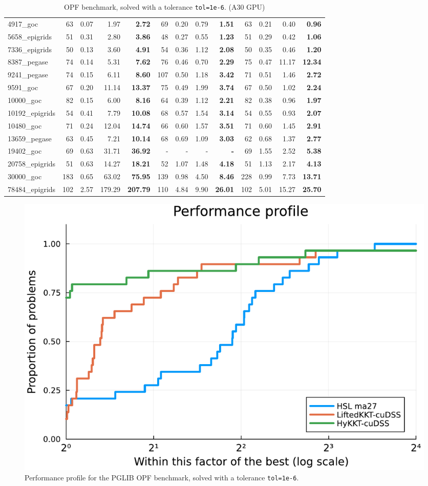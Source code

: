 \begin{table}[!ht]
{\begin{tabular}{|l|rrr >{\bfseries}r|rrr >{\bfseries}r|rrr >{\bfseries}r|}
              \hline
        4917\_goc & 63 & 0.07 & 1.97 & 2.72 & 69 & 0.20 & 0.79 & 1.51 & 63 & 0.21 & 0.40 & 0.96 \\
        5658\_epigrids & 51 & 0.31 & 2.80 & 3.86 & 48 & 0.27 & 0.55 & 1.23 & 51 & 0.29 & 0.42 & 1.06 \\
        7336\_epigrids & 50 & 0.13 & 3.60 & 4.91 & 54 & 0.36 & 1.12 & 2.08 & 50 & 0.35 & 0.46 & 1.20 \\
        8387\_pegase & 74 & 0.14 & 5.31 & 7.62 & 76 & 0.46 & 0.70 & 2.29 & 75 & 0.47 & 11.17 & 12.34 \\
        9241\_pegase & 74 & 0.15 & 6.11 & 8.60 & 107 & 0.50 & 1.18 & 3.42 & 71 & 0.51 & 1.46 & 2.72 \\
              \hline
        9591\_goc & 67 & 0.20 & 11.14 & 13.37 & 75 & 0.49 & 1.99 & 3.74 & 67 & 0.50 & 1.02 & 2.24 \\
        10000\_goc & 82 & 0.15 & 6.00 & 8.16 & 64 & 0.39 & 1.12 & 2.21 & 82 & 0.38 & 0.96 & 1.97 \\
        10192\_epigrids & 54 & 0.41 & 7.79 & 10.08 & 68 & 0.57 & 1.54 & 3.14 & 54 & 0.55 & 0.93 & 2.07 \\
        10480\_goc & 71 & 0.24 & 12.04 & 14.74 & 66 & 0.60 & 1.57 & 3.51 & 71 & 0.60 & 1.45 & 2.91 \\
        13659\_pegase & 63 & 0.45 & 7.21 & 10.14 & 68 & 0.69 & 1.09 & 3.03 & 62 & 0.68 & 1.37 & 2.77 \\
              \hline
        19402\_goc & 69 & 0.63 & 31.71 & 36.92 & - & - & - & - & 69 & 1.55 & 2.52 & 5.38 \\
        20758\_epigrids & 51 & 0.63 & 14.27 & 18.21 & 52 & 1.07 & 1.48 & 4.18 & 51 & 1.13 & 2.17 & 4.13 \\
        30000\_goc & 183 & 0.65 & 63.02 & 75.95 & 139 & 0.98 & 4.50 & 8.46 & 228 & 0.99 & 7.73 & 13.71 \\
        78484\_epigrids & 102 & 2.57 & 179.29 & 207.79 & 110 & 4.84 & 9.90 & 26.01 & 102 & 5.01 & 15.27 & 25.70 \\
      \hline
    \end{tabular}
  }
  \caption{OPF benchmark, solved with a tolerance {\tt tol=1e-6}. (A30 GPU) \label{tab:opf:benchmark}}
\end{table}

\begin{figure}[!ht]
  \centering
  \includegraphics[width=.6\textwidth]{../figures/pprof-cuda.pdf}
  \caption{Performance profile for the PGLIB OPF benchmark, solved
    with a tolerance {\tt tol=1e-6}.
  \label{fig:opf:pprof}}
\end{figure}


